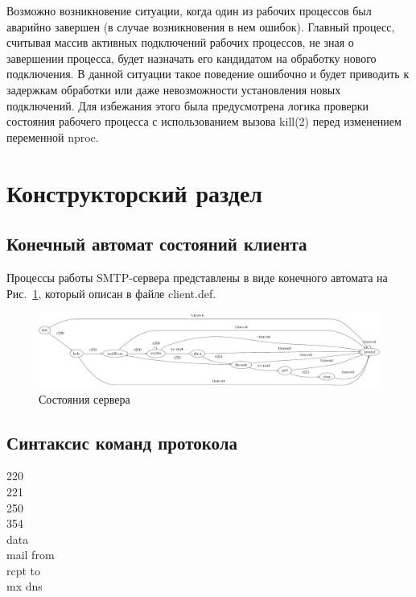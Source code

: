 \documentclass[a4paper,12pt]{report}
\begin{document}
Возможно возникновение ситуации, когда один из рабочих процессов был аварийно завершен (в случае возникновения в нем ошибок). Главный процесс, считывая массив активных подключений рабочих процессов, не зная о завершении процесса, будет назначать его кандидатом на обработку нового подключения. В данной ситуации такое поведение ошибочно и будет приводить к задержкам обработки или даже невозможности установления новых подключений. Для избежания этого была предусмотрена логика проверки состояния рабочего процесса с использованием вызова kill(2) перед изменением переменной nproc.


\section{Конструкторский раздел}

\subsection{Конечный автомат состояний клиента}

Процессы работы SMTP-сервера представлены в виде конечного автомата на Рис.~\ref{fig:fsm}, который описан в файле client.def.

\begin{figure}
\centering
\includegraphics[width=\textwidth]{include/client_def_dot.pdf}
\caption{Состояния сервера}
\label{fig:fsm}
\end{figure}

\subsection{Синтаксис команд протокола}

\begin{description}
\item[220]

\item[221]

\item[250]

\item[354]

\item[data]

\item[mail from]

\item[rcpt to]

\item[mx dns]

\end{description}
\end{document}
